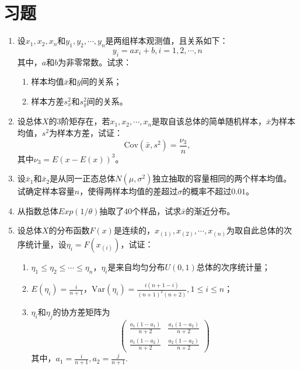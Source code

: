 \section{习题}
\begin{enumerate}
    \item 设$x_1,x_2,x_n$和$y_1,y_2,\cdots,y_n$是两组样本观测值，且关系如下：
$$
y_i = a x_i + b, i=1,2,\cdots,n
$$
其中，$a$和$b$为非零常数。试求：
\begin{enumerate}
    \item 样本均值$\bar{x}$和$\bar{y}$间的关系；
\item 样本方差$s_x^2$和$s_y^2$间的关系。
\end{enumerate}

\item 设总体$X$的$3$阶矩存在，若$x_1,x_2,\cdots,x_n$是取自该总体的简单随机样本，$\bar{x}$为样本均值，$s^2$为样本方差，试证：
$$
\text{Cov}(\bar{x},s^2) = \frac{\nu_3}{n},
$$
其中$\nu_3 = E(x-E(x))^3$。

\item 设$\bar{x}_1$和$\bar{x}_2$是从同一正态总体$N(\mu,\sigma^2)$独立抽取的容量相同的两个样本均值。试确定样本容量$n$，使得两样本均值的差超过$\sigma$的概率不超过$0.01$。

\item 从指数总体$Exp(1/\theta)$抽取了$40$个样品，试求$\bar{x}$的渐近分布。

\item  设总体$X$的分布函数$F(x)$是连续的，$x_{(1)},x_{(2)},\cdots,x_{(n)}$为取自此总体的次序统计量，设$\eta_i = F(x_{(i)})$，试证：
\begin{enumerate}
    \item $\eta_1 \leq \eta_2 \leq \cdots \leq \eta_n$，$\eta_i$是来自均匀分布$U(0,1)$总体的次序统计量；
\item $E(\eta_i) = \frac{i}{n+1}$，$\text{Var}(\eta_i) = \frac{i(n+1-i)}{(n+1)^2(n+2)}, 1\leq i\leq n$；
\item $\eta_i$和$\eta_j$的协方差矩阵为
$$
\begin{pmatrix}
\frac{a_1(1-a_1)}{n+2} & \frac{a_1(1-a_2)}{n+2}\\
\frac{a_1(1-a_2)}{n+2} & \frac{a_2(1-a_2)}{n+2}
\end{pmatrix}
$$
其中，$a_1 = \frac{i}{n+1},a_2  = \frac{j}{n+1}$.
\end{enumerate}
\end{enumerate}
